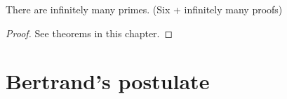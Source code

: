 \begin{theorem}
    \label{thm:infinity_of_primes}
    There are infinitely many primes. (Six + infinitely many proofs)
    \leanok
\end{theorem}
\begin{proof}
    See theorems in this chapter.
\end{proof}


\chapter{Bertrand's postulate}

